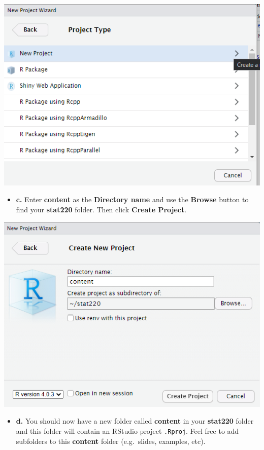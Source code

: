 \documentclass[
]{book}
\providecommand{\tightlist}{%
  \setlength{\itemsep}{0pt}\setlength{\parskip}{0pt}}
\begin{document}
\includegraphics{img/maize_newdirectory2.png}

\begin{itemize}
\tightlist
\item
  \textbf{c.} Enter \textbf{content} as the \textbf{Directory name} and use the
  \textbf{Browse} button to find your \textbf{stat220} folder. Then click
  \textbf{Create Project}.
\end{itemize}

\includegraphics{img/maize_create.png}

\begin{itemize}
\tightlist
\item
  \textbf{d.} You should now have a new folder called \textbf{content} in your
  \textbf{stat220} folder and this folder will contain an RStudio project
  \texttt{.Rproj}. Feel free to add subfolders to this \textbf{content} folder
  (e.g.~slides, examples, etc).
\end{itemize}
\end{document}

